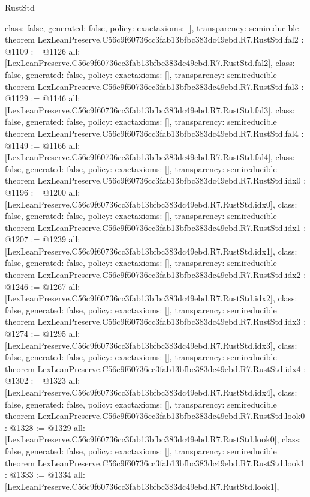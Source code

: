 \begin{lexlean}{RustStd}
\begin{coremodule}
{  class: false,
  generated: false,
  policy: exact{axioms: []},
  transparency: semireducible
}
theorem LexLeanPreserve.C56c9f60736cc3fab13bfbc383dc49ebd.R7.RustStd.fal2 : @1109 := @1126 {
  all: [LexLeanPreserve.C56c9f60736cc3fab13bfbc383dc49ebd.R7.RustStd.fal2],
  class: false,
  generated: false,
  policy: exact{axioms: []},
  transparency: semireducible
}
theorem LexLeanPreserve.C56c9f60736cc3fab13bfbc383dc49ebd.R7.RustStd.fal3 : @1129 := @1146 {
  all: [LexLeanPreserve.C56c9f60736cc3fab13bfbc383dc49ebd.R7.RustStd.fal3],
  class: false,
  generated: false,
  policy: exact{axioms: []},
  transparency: semireducible
}
theorem LexLeanPreserve.C56c9f60736cc3fab13bfbc383dc49ebd.R7.RustStd.fal4 : @1149 := @1166 {
  all: [LexLeanPreserve.C56c9f60736cc3fab13bfbc383dc49ebd.R7.RustStd.fal4],
  class: false,
  generated: false,
  policy: exact{axioms: []},
  transparency: semireducible
}
theorem LexLeanPreserve.C56c9f60736cc3fab13bfbc383dc49ebd.R7.RustStd.idx0 : @1196 := @1200 {
  all: [LexLeanPreserve.C56c9f60736cc3fab13bfbc383dc49ebd.R7.RustStd.idx0],
  class: false,
  generated: false,
  policy: exact{axioms: []},
  transparency: semireducible
}
theorem LexLeanPreserve.C56c9f60736cc3fab13bfbc383dc49ebd.R7.RustStd.idx1 : @1207 := @1239 {
  all: [LexLeanPreserve.C56c9f60736cc3fab13bfbc383dc49ebd.R7.RustStd.idx1],
  class: false,
  generated: false,
  policy: exact{axioms: []},
  transparency: semireducible
}
theorem LexLeanPreserve.C56c9f60736cc3fab13bfbc383dc49ebd.R7.RustStd.idx2 : @1246 := @1267 {
  all: [LexLeanPreserve.C56c9f60736cc3fab13bfbc383dc49ebd.R7.RustStd.idx2],
  class: false,
  generated: false,
  policy: exact{axioms: []},
  transparency: semireducible
}
theorem LexLeanPreserve.C56c9f60736cc3fab13bfbc383dc49ebd.R7.RustStd.idx3 : @1274 := @1295 {
  all: [LexLeanPreserve.C56c9f60736cc3fab13bfbc383dc49ebd.R7.RustStd.idx3],
  class: false,
  generated: false,
  policy: exact{axioms: []},
  transparency: semireducible
}
theorem LexLeanPreserve.C56c9f60736cc3fab13bfbc383dc49ebd.R7.RustStd.idx4 : @1302 := @1323 {
  all: [LexLeanPreserve.C56c9f60736cc3fab13bfbc383dc49ebd.R7.RustStd.idx4],
  class: false,
  generated: false,
  policy: exact{axioms: []},
  transparency: semireducible
}
theorem LexLeanPreserve.C56c9f60736cc3fab13bfbc383dc49ebd.R7.RustStd.look0 : @1328 := @1329 {
  all: [LexLeanPreserve.C56c9f60736cc3fab13bfbc383dc49ebd.R7.RustStd.look0],
  class: false,
  generated: false,
  policy: exact{axioms: []},
  transparency: semireducible
}
theorem LexLeanPreserve.C56c9f60736cc3fab13bfbc383dc49ebd.R7.RustStd.look1 : @1333 := @1334 {
  all: [LexLeanPreserve.C56c9f60736cc3fab13bfbc383dc49ebd.R7.RustStd.look1],
}
\end{coremodule}
\end{lexlean}
